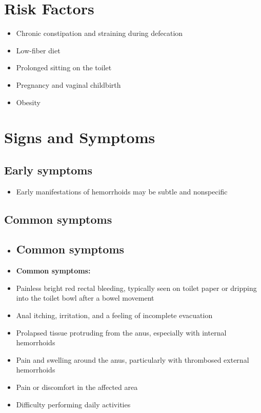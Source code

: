 \section{Risk Factors}

\begin{itemize}[noitemsep]
  \item Chronic constipation and straining during defecation
  \item Low-fiber diet
  \item Prolonged sitting on the toilet
  \item Pregnancy and vaginal childbirth
  \item Obesity
\end{itemize}

\section{Signs and Symptoms}

\subsection{Early symptoms}
\begin{itemize}[noitemsep]
  \item Early manifestations of hemorrhoids may be subtle and nonspecific
\end{itemize}

\subsection{Common symptoms}
\begin{itemize}[noitemsep]
  \item \subsection{Common symptoms}
  \item \textbf{Common symptoms:}
  \item Painless bright red rectal bleeding, typically seen on toilet paper or dripping into the toilet bowl after a bowel movement
  \item Anal itching, irritation, and a feeling of incomplete evacuation
  \item Prolapsed tissue protruding from the anus, especially with internal hemorrhoids
  \item Pain and swelling around the anus, particularly with thrombosed external hemorrhoids
  \item Pain or discomfort in the affected area
  \item Difficulty performing daily activities
\end{itemize}

